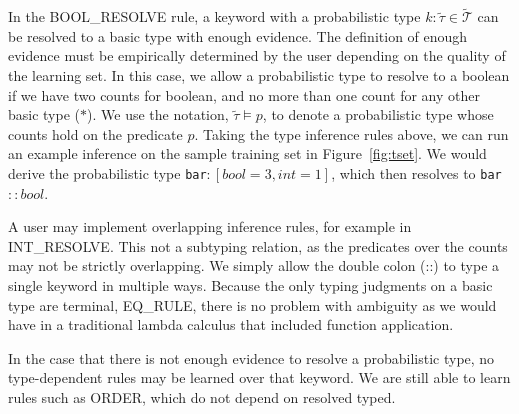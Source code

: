 In the {\scriptsize BOOL\_RESOLVE} rule, a keyword with a probabilistic type $k : \tilde{\tau} \in \tilde{\mathcal{T}}$ can be resolved to a basic type with enough evidence.
The definition of enough evidence must be empirically determined by the user depending on the quality of the learning set.
In this case, we allow a probabilistic type to resolve to a boolean if we have two counts for boolean, and no more than one count for any other basic type ($\ast$).
We use the notation, $\tilde{\tau} \models p$, to denote a probabilistic type whose counts hold on the predicate $p$.
Taking the type inference rules above, we can run an example inference on the sample training set in Figure~\ref{fig:tset}.
We would derive the probabilistic type \texttt{bar}$:[bool=3,int=1]$, which then resolves to \texttt{bar}$::bool$.
 
A user may implement overlapping inference rules, for example in {\scriptsize INT\_RESOLVE}.
This not a subtyping relation, as the predicates over the counts may not be strictly overlapping.
We simply allow the double colon (::) to type a single keyword in multiple ways.
Because the only typing judgments on a basic type are terminal, {\scriptsize EQ\_RULE}, there is no problem with ambiguity as we would have in a traditional lambda calculus that included function application.


In the case that there is not enough evidence to resolve a probabilistic type, no type-dependent rules may be learned over that keyword.
We are still able to learn rules such as {\scriptsize ORDER}, which do not depend on resolved typed. 



